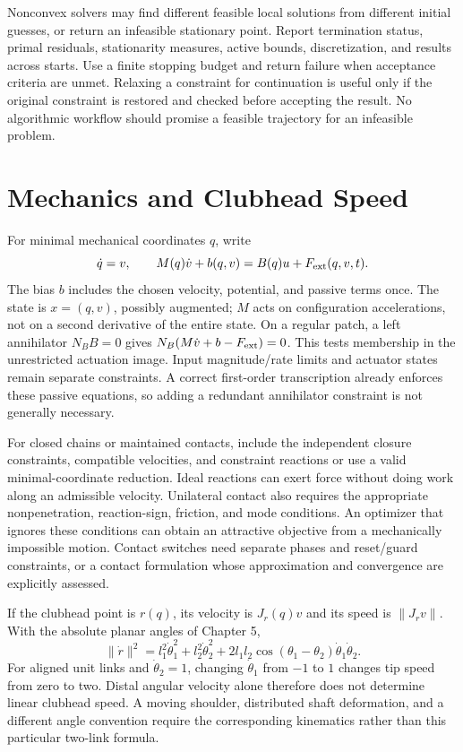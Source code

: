 \documentclass[12pt, openany]{book}
\theoremstyle{plain}
\begin{document}
Nonconvex solvers may find different feasible local solutions from different
initial guesses, or return an infeasible stationary point. Report termination
status, primal residuals, stationarity measures, active bounds, discretization,
and results across starts. Use a finite stopping budget and return failure
when acceptance criteria are unmet. Relaxing a constraint for continuation
is useful only if the original constraint is restored and checked before
accepting the result. No algorithmic workflow should promise a feasible
trajectory for an infeasible problem.

\section{Mechanics and Clubhead Speed}

For minimal mechanical coordinates $q$, write
\begin{equation}\label{eq:ocp_underactuation}
 \dot q=v,\qquad M(q)\dot v+b(q,v)=B(q)u+F_{\rm ext}(q,v,t).
\end{equation}
The bias $b$ includes the chosen velocity, potential, and passive terms once.
The state is $x=(q,v)$, possibly augmented; $M$ acts on configuration
accelerations, not on a second derivative of the entire state. On a regular
patch, a left annihilator $N_BB=0$ gives
$N_B(M\dot v+b-F_{\rm ext})=0$. This tests membership in the unrestricted
actuation image. Input magnitude/rate limits and actuator states remain
separate constraints. A correct first-order transcription already enforces
these passive equations, so adding a redundant annihilator constraint is
not generally necessary.

For closed chains or maintained contacts, include the independent closure
constraints, compatible velocities, and constraint reactions or use a valid
minimal-coordinate reduction. Ideal reactions can exert force without doing
work along an admissible velocity. Unilateral contact also requires the
appropriate nonpenetration, reaction-sign, friction, and mode conditions.
An optimizer that ignores these conditions can obtain an attractive objective
from a mechanically impossible motion. Contact switches need separate phases
and reset/guard constraints, or a contact formulation whose approximation
and convergence are explicitly assessed.

If the clubhead point is $r(q)$, its velocity is $J_r(q)v$ and its speed is
$\|J_rv\|$. With the absolute planar angles of Chapter 5,
\begin{equation}\label{eq:ocp_clubhead_speed}
 \|\dot r\|^2=l_1^2\dot\theta_1^2+l_2^2\dot\theta_2^2
 +2l_1l_2\cos(\theta_1-\theta_2)\dot\theta_1\dot\theta_2.
\end{equation}
For aligned unit links and $\dot\theta_2=1$, changing $\dot\theta_1$ from
$-1$ to $1$ changes tip speed from zero to two. Distal angular velocity
alone therefore does not determine linear clubhead speed. A moving shoulder,
distributed shaft deformation, and a different angle convention require the
corresponding kinematics rather than this particular two-link formula.
\end{document}
